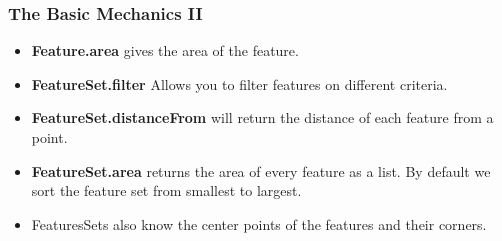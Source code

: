 \documentclass{beamer}
\begin{document}
\begin{frame}
  \frametitle{The Basic Mechanics II}

\begin{itemize}
\item \textbf{Feature.area} gives the area of the feature.
\item \textbf{FeatureSet.filter} Allows you to filter features on
  different criteria.
\item \textbf{FeatureSet.distanceFrom} will return the distance of
  each feature from a point.
\item \textbf{FeatureSet.area} returns the area of every feature as a
  list. By default we sort the feature set from smallest to largest.
\item FeaturesSets also know the center points of the features and
  their corners. 
\end{itemize}
\end{frame}

\end{document}
